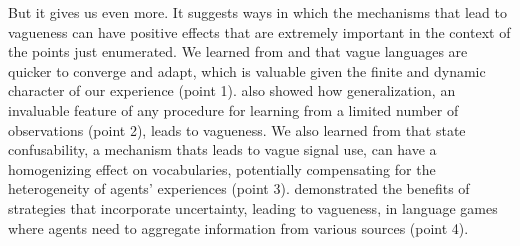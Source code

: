 \documentclass[a4paper]{article}
\begin{document}
But it gives us even more.
It suggests ways in which the mechanisms that lead to vagueness can have positive effects that are extremely important in the context of the points just enumerated.
We learned from \citeauthor{oconnor_evolution_2014} and \citeauthor{franke_vagueness_2017} that vague languages are quicker to converge and adapt, which is valuable given the finite and dynamic character of our experience (point 1).
\citeauthor{oconnor_evolving_2015} also showed how generalization, an invaluable feature of any procedure for learning from a limited number of observations (point 2), leads to vagueness.
We also learned from \citeauthor{franke_vagueness_2017} that state confusability, a mechanism thats leads to vague signal use, can have a homogenizing effect on vocabularies, potentially compensating for the heterogeneity of agents' experiences (point 3).
\citeauthor{lawry_vagueness_2017} demonstrated the benefits of strategies that incorporate uncertainty, leading to vagueness, in language games where agents need to aggregate information from various sources (point 4).
\end{document}
